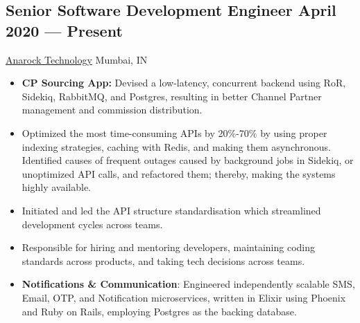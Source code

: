 \documentclass[a4,10pt]{article}
\newcommand{\subtext}[1]{
#1\par\vspace{-0.2cm}}
\newenvironment{zitemize}{
\begin{itemize}\itemsep0pt \parskip0pt \parsep1pt}
{\end{itemize}\vspace{-0.5cm}}
\begin{document}
\subsection*{Senior Software Development Engineer \hfill April 2020 --- Present} 
\subtext{\href{https://tech.anarock.com/}{Anarock Technology} \hfill Mumbai, IN} 
    \begin{zitemize}

        \item {\bf CP Sourcing App: } Devised a low-latency, concurrent backend using RoR, Sidekiq, RabbitMQ, and Postgres, resulting in better Channel Partner management and commission distribution.
        \item Optimized the most time-consuming APIs by 20\%-70\% by using proper indexing strategies, caching with Redis, and making them asynchronous. Identified causes of frequent outages caused by background jobs in Sidekiq, or unoptimized API calls, and refactored them; thereby, making the systems highly available.
        \item Initiated and led the API structure standardisation which streamlined development cycles across teams.
        \item Responsible for hiring and mentoring developers, maintaining coding standards across products, and taking tech decisions across teams.
        \item {\bf Notifications \& Communication}: Engineered independently scalable SMS, Email, OTP, and Notification microservices, written in Elixir using Phoenix and Ruby on Rails, employing Postgres as the backing database.
    \end{zitemize}

\end{document}
